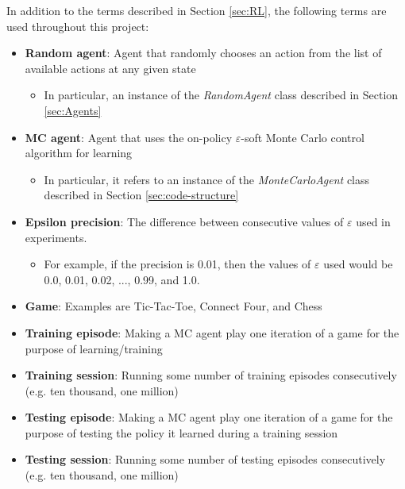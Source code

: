 \documentclass[11pt,a4paper,twoside,openright]{report}
\begin{document}
In addition to the terms described in Section \ref{sec:RL}, the following terms are used throughout this project:

\begin{itemize}

	\item \textbf{Random agent}: Agent that randomly chooses an action from the list of available actions at any given state
		\begin{itemize}
			\item In particular, an instance of the \emph{RandomAgent} class described in Section \ref{sec:Agents}
		\end{itemize}

	\item \textbf{MC agent}: Agent that uses the on-policy $\varepsilon$-soft Monte Carlo control algorithm for learning
		\begin{itemize}
			\item In particular, it refers to an instance of the \emph{MonteCarloAgent} class described in Section \ref{sec:code-structure}
		\end{itemize}

	\item \textbf{Epsilon precision}: The difference between consecutive values of $\varepsilon$ used in experiments.
		\begin{itemize}
			\item For example, if the precision is 0.01, then the values of $\varepsilon$ used would be 0.0, 0.01, 0.02, ..., 0.99, and 1.0.
		\end{itemize}

	\item \textbf{Game}: Examples are Tic-Tac-Toe, Connect Four, and Chess

	\item \textbf{Training episode}: Making a MC agent play one iteration of a game for the purpose of learning/training

	\item \textbf{Training session}: Running some number of training episodes consecutively (e.g. ten thousand, one million)

	\item \textbf{Testing episode}: Making a MC agent play one iteration of a game for the purpose of testing the policy it learned during a training session

	\item \textbf{Testing session}: Running some number of testing episodes consecutively (e.g. ten thousand, one million)

\end{itemize}
\end{document}
